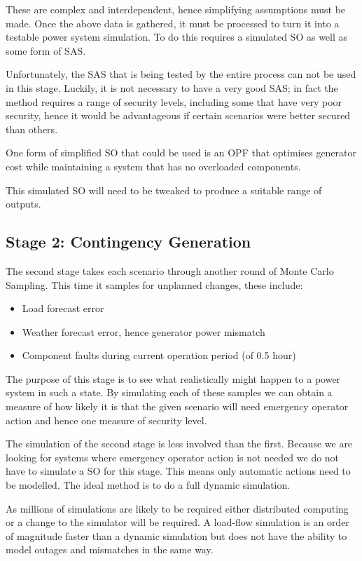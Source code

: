 \documentclass[a4paper,oneside,12pt]{report}
\begin{document}
These are complex and interdependent, hence simplifying assumptions must be made. Once the above data is gathered, it must be processed to turn it into a testable power system simulation. To do this requires a simulated SO as well as some form of SAS.

Unfortunately, the SAS that is being tested by the entire process can not be used in this stage. Luckily, it is not necessary to have a very good SAS; in fact the method requires a range of security levels, including some that have very poor security, hence it would be advantageous if certain scenarios were better secured than others.

One form of simplified SO that could be used is an OPF that optimises generator cost while maintaining a system that has no overloaded components.

This simulated SO will need to be tweaked to produce a suitable range of outputs.

\subsection{Stage 2: Contingency Generation}

The second stage takes each scenario through another round of Monte Carlo Sampling. This time it samples for unplanned changes, these include:

\begin{itemize}
  \item Load forecast error
  \item Weather forecast error, hence generator power mismatch
  \item Component faults during current operation period (of 0.5 hour)
\end{itemize}

The purpose of this stage is to see what realistically might happen to a power system in such a state. By simulating each of these samples we can obtain a measure of how likely it is that the given scenario will need emergency operator action and hence one measure of security level.

The simulation of the second stage is less involved than the first. Because we are looking for systems where emergency operator action is not needed we do not have to simulate a SO for this stage. This means only automatic actions need to be modelled. The ideal method is to do a full dynamic simulation.

As millions of simulations are likely to be required either distributed computing or a change to the simulator will be required. A load-flow simulation is an order of magnitude faster than a dynamic simulation but does not have the ability to model outages and mismatches in the same way.
\end{document}
